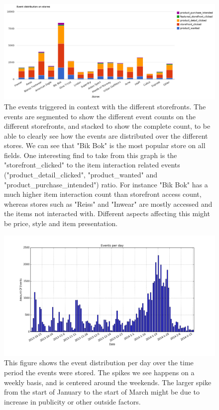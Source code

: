     \begin{figure}[H]
        \includegraphics[width=5in]{image/event_distr.png}
        \centering
        \caption[Distribution of events on storefronts]{The events triggered in context with the different storefronts.
        The events are segmented to show the different event counts on the different storefronts, and stacked to show the complete count, to be able to clearly see how the events are distributed over the different stores.
        We can see that "Bik Bok" is the most popular store on all fields.
        One interesting find to take from this graph is the "storefront\_clicked" to the item interaction related events ("product\_detail\_clicked", "product\_wanted" and "product\_purchase\_intended") ratio.
        For instance "Bik Bok" has a much higher item interaction count than storefront access count, whereas stores such as "Reiss" and "Inwear" are mostly accessed and the items not interacted with.
        Different aspects affecting this might be price, style and item presentation.}
    \end{figure}


    \begin{figure}[H]
        \includegraphics[width=5in]{image/eventsPerDay.png}
        \centering
        \caption[Distribution of events per day]{This figure shows the event distribution per day over the time period the events were stored.
        The spikes we see happens on a weekly basis, and is centered around the weekends.
        The larger spike from the start of January to the start of March might be due to increase in publicity or other outside factors.}
    \end{figure}

